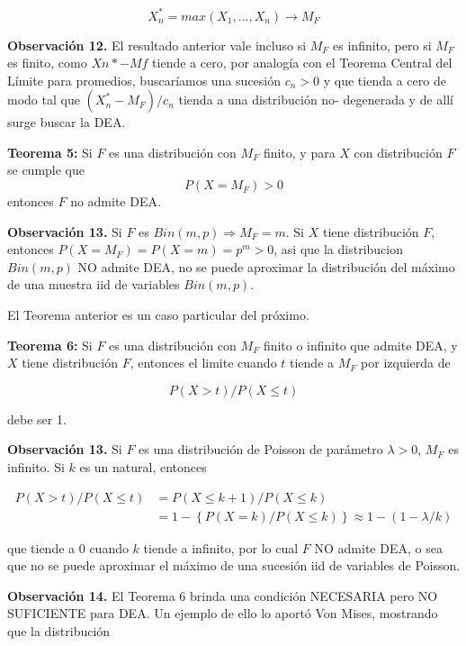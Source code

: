 \documentclass[
  20pt,
]{book}
\theoremstyle{definition}
\theoremstyle{definition}
\theoremstyle{definition}
\theoremstyle{definition}
\theoremstyle{remark}
\begin{document}
\begin{equation}
X_n^{\ast} =max(X_1,...,X_n) \rightarrow M_F
\end{equation}

\textbf{Observación 12.} El resultado anterior vale
incluso si \(M_F\) es infinito, pero si \(M_F\) es finito, como
\(Xn* - Mf\) tiende a cero, por analogía con el Teorema
Central del Límite para promedios, buscaríamos
una sucesión \(c_n>0\) y que tienda a cero de modo tal
que \((X_n^{\ast}- M_F )/ c_n\) tienda a una distribución no-
degenerada y de allí surge buscar la DEA.

\textbf{Teorema 5:} Si \(F\) es una distribución con \(M_F\) finito, y para \(X\) con distribución \(F\) se cumple que
\begin{equation}
P(X=M_F)>0
\end{equation}
entonces \(F\) no admite DEA.

\textbf{Observación 13.} Si \(F\) es \(Bin(m,p) \Rightarrow M_F=m\). Si \(X\)
tiene distribución \(F\), entonces
\(P( X=M_F)= P( X=m)= p^m>0\),
asi que la distribucion \(Bin(m,p)\) NO admite DEA,
no se puede aproximar la distribución del máximo
de una muestra iid de variables \(Bin(m,p)\).

El Teorema anterior es un caso particular del
próximo.

\textbf{Teorema 6:} Si \(F\) es una distribución con \(M_F\) finito o infinito que
admite DEA, y \(X\) tiene distribución \(F\), entonces el
limite cuando \(t\) tiende a \(M_F\) por izquierda de

\begin{equation}
P(X>t)/P(X \leq t)
\end{equation}

debe ser 1.

\textbf{Observación 13.} Si \(F\) es una distribución de
Poisson de parámetro \(\lambda >0\), \(M_F\) es infinito. Si \(k\) es un
natural, entonces

\begin{align}
P(X>t)/P(X \leq t)& = P(X \leq k+1)/P(X \leq k)\\
& = 1-\left\{ P(X=k)/P(X \leq k) \right\} \approx 1-(1- \lambda/k)
\end{align}

que tiende a 0 cuando \(k\) tiende a infinito, por lo
cual \(F\) NO admite DEA, o sea que no se puede aproximar el máximo de una sucesión iid de variables de Poisson.

\textbf{Observación 14.} El Teorema 6 brinda una
condición NECESARIA pero NO SUFICIENTE
para DEA. Un ejemplo de ello lo aportó Von Mises,
mostrando que la distribución
\end{document}
